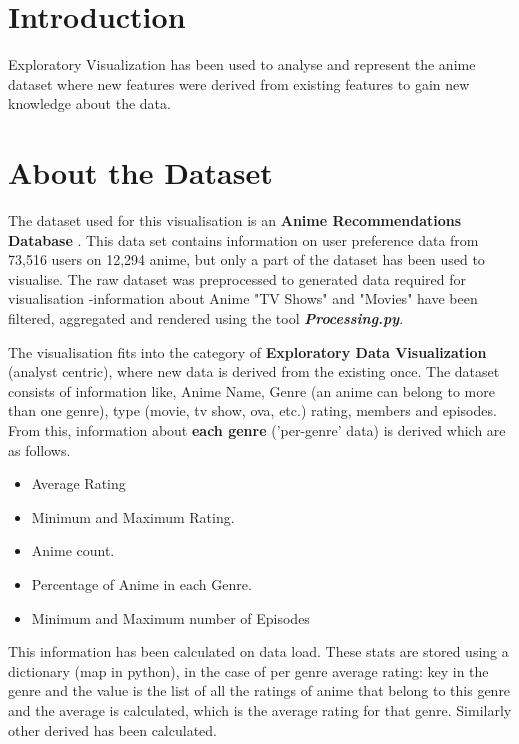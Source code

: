 \documentclass[a4paper, 10pt]{article}
\begin{document}


\section{Introduction}
    Exploratory Visualization has been used to analyse and represent the anime dataset where new features were derived from existing features to gain new knowledge about the data.

\section{About the Dataset}
    \qquad The dataset used for this visualisation is an \textbf{Anime Recommendations Database} \cite{anime-dataset}. This data set contains information on user preference data from 73,516 users on 12,294 anime, but only a part of the dataset has been used to visualise. The raw dataset was preprocessed to generated data required for visualisation -information about Anime "TV Shows" and "Movies" have been filtered, aggregated and rendered using the tool \textbf{\textit{Processing.py}}. 
    
    \qquad The visualisation fits into the category of \textbf{Exploratory Data Visualization} (analyst centric), where new data is derived from the existing once. The dataset consists of information like, Anime Name, Genre (an anime can belong to more than one genre), type (movie, tv show, ova, etc.) rating, members and episodes. From this, information about \textbf{each genre} ('per-genre' data) is derived which are as follows.
    \begin{itemize}
    \item Average Rating
    \item Minimum and Maximum Rating.
    \item Anime count.
    \item Percentage of Anime in each Genre.
    \item Minimum and Maximum number of Episodes
    \end{itemize}
    \qquad This information has been calculated on data load. These stats are stored using a dictionary (map in python), in the case of per genre average rating: key in the genre and the value is the list of all the ratings of anime that belong to this genre and the average is calculated, which is the average rating for that genre. Similarly other derived has been calculated.
    
\end{document}
